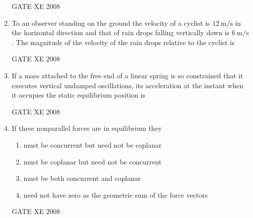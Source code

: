 \documentclass[12pt]{article}
\begin{document}
\begin{enumerate}[label=Q\arabic*.]
GATE XE 2008

\item To an observer standing on the ground the velocity of a cyclist is $12 \ \text{m/s}$ in the horizontal direction and that of rain drops falling vertically down is $6 \ \text{m/s}$. The magnitude of the velocity of the rain drops relative to the cyclist is  

\begin{enumerate}[label=(\Alph*)]
\end{enumerate}

GATE XE 2008

\item If a mass attached to the free end of a linear spring is so constrained that it executes vertical undamped oscillations, its acceleration at the instant when it occupies the static equilibrium position is  

\begin{enumerate}[label=(\Alph*)]
\end{enumerate}

GATE XE 2008

\item If three nonparallel forces are in equilibrium they  

\begin{enumerate}[label=(\Alph*)]
\item  must be concurrent but need not be coplanar  
\item  must be coplanar but need not be concurrent  
\item  must be both concurrent and coplanar  
\item  need not have zero as the geometric sum of the force vectors  
\end{enumerate}

GATE XE 2008


\end{enumerate}
\end{document}
